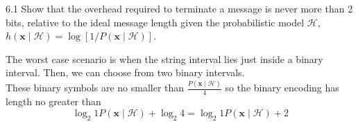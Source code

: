\documentclass[12pt, a4paper]{article}
\begin{document}
\begin{prob}{6.1}
    Show that the overhead required to terminate a message is never more than 2 bits, relative to the ideal message length given the probabilistic model $\mathcal{H}$, $h(\mathbf{x} \mid \mathcal{H}) = \log [1 / P(\mathbf{x} \mid \mathcal{H})]$.
\end{prob}
\begin{sol}
    The worst case scenario is when the string interval lies just inside a binary interval. Then, we can choose from two binary intervals. \\
    These binary symbols are no smaller than $\frac{P(\mathbf{x} \mid \mathcal{H})}{4}$ so the binary encoding has length no greater than
    $$\log_2{1}{P(\mathbf{x} \mid \mathcal{H})} + \log_2 4 = \log_2{1}{P(\mathbf{x} \mid \mathcal{H})} + 2$$
\end{sol}
\bigskip


\begin{prob}{}
\end{prob}
\begin{sol}
\end{sol}
\bigskip
\end{document}
